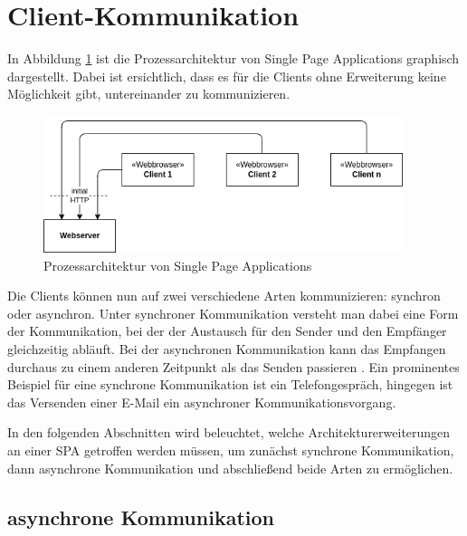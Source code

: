 \documentclass[12pt]{book}          %
\begin{document}
\section{Client-Kommunikation}
\label{sec-sync-async-comm}

In Abbildung \ref{spa-lonely-architecture} ist die Prozessarchitektur von Single Page Applications graphisch dargestellt. Dabei ist ersichtlich, dass es für die Clients ohne Erweiterung keine Möglichkeit gibt, untereinander zu kommunizieren.

\begin{figure}[htbp]
\centering
\includegraphics[height=4cm]{abbildungen/spa/spa-lonely.png}
\caption{Prozessarchitektur von Single Page Applications}
\label{spa-lonely-architecture}
\end{figure}

Die Clients können nun auf zwei verschiedene Arten kommunizieren: synchron oder asynchron. Unter synchroner Kommunikation versteht man dabei eine Form der Kommunikation, bei der der Austausch für den Sender und den Empfänger gleichzeitig abläuft. Bei der asynchronen Kommunikation kann das Empfangen durchaus zu einem anderen Zeitpunkt als das Senden passieren \cite[1]{cacciagrano_synchronous_2001}. Ein prominentes Beispiel für eine synchrone Kommunikation ist ein Telefongespräch, hingegen ist das Versenden einer E-Mail ein asynchroner Kommunikationsvorgang.

In den folgenden Abschnitten wird beleuchtet, welche Architekturerweiterungen an einer SPA getroffen werden müssen, um zunächst synchrone Kommunikation, dann asynchrone Kommunikation und abschließend beide Arten zu ermöglichen.

\subsection{asynchrone Kommunikation}
\label{subsc-async-comm}
\end{document}
